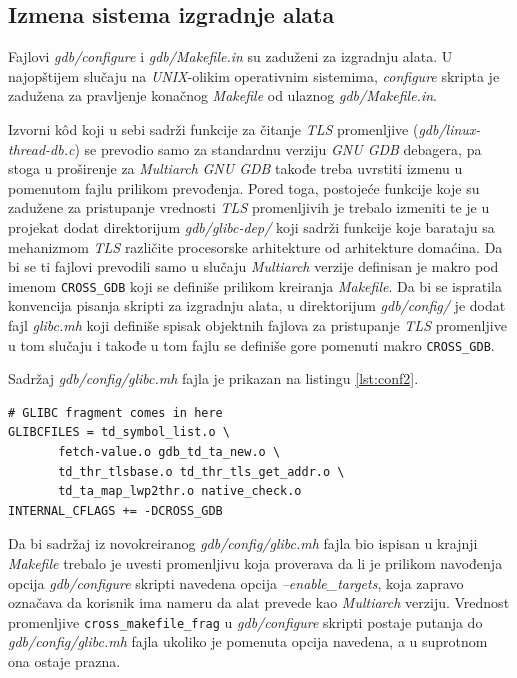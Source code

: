 \documentclass[12pt,oneside]{memoir}
\begin{document}
\subsection{Izmena sistema izgradnje alata}

Fajlovi \emph{gdb/configure} i \emph{gdb/Makefile.in} su zaduženi za izgradnju alata. U najopštijem slučaju na \emph{UNIX}-olikim operativnim sistemima, \emph{configure} skripta je zadužena za pravljenje konačnog \emph{Makefile} od ulaznog \emph{gdb/Makefile.in}.

Izvorni k\^{o}d koji u sebi sadrži funkcije za čitanje \emph{TLS} promenljive (\emph{gdb/linux-thread-db.c}) se prevodio samo za standardnu verziju \emph{GNU GDB} debagera, pa stoga u proširenje za \emph{Multiarch} \emph{GNU GDB} takođe treba uvrstiti izmenu u pomenutom fajlu prilikom prevođenja. Pored toga, postojeće funkcije koje su zadužene za pristupanje vrednosti \emph{TLS} promenljivih je trebalo izmeniti te je u projekat dodat direktorijum \emph{gdb/glibc-dep/} koji sadrži funkcije koje barataju sa mehanizmom \emph{TLS} različite procesorske arhitekture od arhitekture domaćina. Da bi se ti fajlovi prevodili samo u slučaju \emph{Multiarch} verzije definisan je makro pod imenom \texttt{CROSS\_GDB} koji se definiše prilikom kreiranja \emph{Makefile}. Da bi se ispratila konvencija pisanja skripti za izgradnju alata, u direktorijum \emph{gdb/config/} je dodat fajl \emph{glibc.mh} koji definiše spisak objektnih fajlova za pristupanje \emph{TLS} promenljive u tom slučaju i takođe u tom fajlu se definiše gore pomenuti makro \texttt{CROSS\_GDB}.

Sadržaj \emph{gdb/config/glibc.mh} fajla je prikazan na listingu \ref{lst:conf2}.
\begin{lstlisting}[label={lst:conf2}, caption={Sadržaj \emph{gdb/config/glibc.mh} fajla}]
# GLIBC fragment comes in here
GLIBCFILES = td_symbol_list.o \
       fetch-value.o gdb_td_ta_new.o \
       td_thr_tlsbase.o td_thr_tls_get_addr.o \
       td_ta_map_lwp2thr.o native_check.o
INTERNAL_CFLAGS += -DCROSS_GDB
\end{lstlisting}

Da bi sadržaj iz novokreiranog \emph{gdb/config/glibc.mh} fajla bio ispisan u krajnji \emph{Makefile} trebalo je uvesti promenljivu koja proverava da li je prilikom navođenja opcija \emph{gdb/configure} skripti navedena opcija \emph{--enable\_targets}, koja zapravo označava da korisnik ima nameru da alat prevede kao \emph{Multiarch} verziju. Vrednost promenljive \texttt{cross\_makefile\_frag} u \emph{gdb/configure} skripti postaje putanja do \emph{gdb/config/glibc.mh} fajla ukoliko je pomenuta opcija navedena, a u suprotnom ona ostaje prazna.
\end{document}
